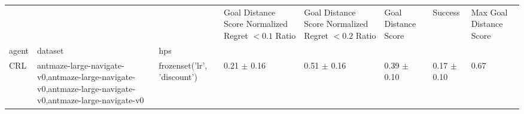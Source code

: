 \begin{tabular}{llllllll}
\toprule
 &  &  & Goal Distance Score Normalized Regret $< 0.1$ Ratio & Goal Distance Score Normalized Regret $< 0.2$ Ratio & Goal Distance Score & Success & Max Goal Distance Score \\
agent & dataset & hps &  &  &  &  &  \\
\midrule
CRL & antmaze-large-navigate-v0,antmaze-large-navigate-v0,antmaze-large-navigate-v0,antmaze-large-navigate-v0 & frozenset({'lr', 'discount'}) & 0.21 $\pm$ 0.16 & 0.51 $\pm$ 0.16 & 0.39 $\pm$ 0.10 & 0.17 $\pm$ 0.10 & 0.67 \\
\cline{1-8} \cline{2-8}
\bottomrule
\end{tabular}
